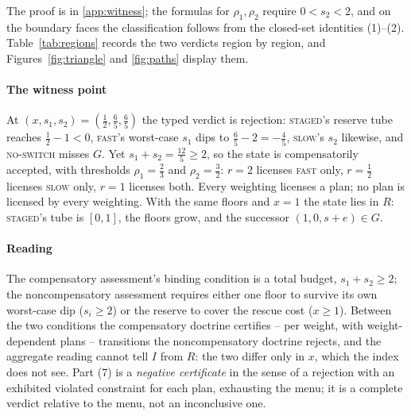 \documentclass[preprint,11pt,authoryear]{elsarticle}
\theoremstyle{definition}
\theoremstyle{remark}
\newcommand{\act}[1]{\textsc{#1}}
\begin{document}
The proof is in \ref{app:witness}; the formulas for $\rho_1,\rho_2$ require $0<s_2<2$, and on the boundary faces the classification follows from the closed-set identities (1)--(2). Table~\ref{tab:regions} records the two verdicts region by region, and Figures~\ref{fig:triangle} and \ref{fig:paths} display them.

\paragraph{The witness point} At $(x,s_1,s_2)=(\tfrac12,\tfrac65,\tfrac65)$ the typed verdict is rejection: \act{staged}'s reserve tube reaches $\tfrac12-1<0$, \act{fast}'s worst-case $s_1$ dips to $\tfrac65-2=-\tfrac45$, \act{slow}'s $s_2$ likewise, and \act{no-switch} misses $G$. Yet $s_1+s_2=\tfrac{12}5\ge2$, so the state is compensatorily accepted, with thresholds $\rho_1=\tfrac23$ and $\rho_2=\tfrac32$: $r=2$ licenses \act{fast} only, $r=\tfrac12$ licenses \act{slow} only, $r=1$ licenses both. Every weighting licenses a plan; no plan is licensed by every weighting. With the same floors and $x=1$ the state lies in $R$: \act{staged}'s tube is $[0,1]$, the floors grow, and the successor $(1,0,s+e)\in G$.

\paragraph{Reading} The compensatory assessment's binding condition is a total budget, $s_1+s_2\ge2$; the noncompensatory assessment requires either one floor to survive its own worst-case dip ($s_i\ge2$) or the reserve to cover the rescue cost ($x\ge1$). Between the two conditions the compensatory doctrine certifies -- per weight, with weight-dependent plans -- transitions the noncompensatory doctrine rejects, and the aggregate reading cannot tell $I$ from $R$: the two differ only in $x$, which the index does not see. Part (7) is a \emph{negative certificate} in the sense of a rejection with an exhibited violated constraint for each plan, exhausting the menu; it is a complete verdict relative to the menu, not an inconclusive one.
\end{document}

